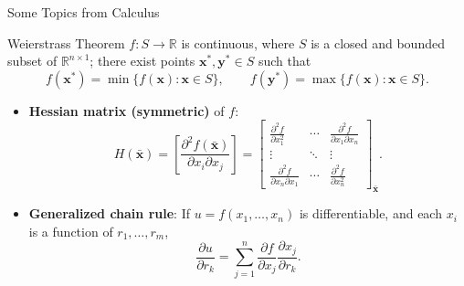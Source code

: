 \documentclass[aspectratio=169,hyperref,UTF8,CJK]{beamer}
\newcommand{\R}{\mathbb{R}}
\newcommand{\vect}[1]{\boldsymbol{#1}}
\begin{document}
\begin{frame}{Some Topics from Calculus}
  \scriptsize
  \begin{block}{Weierstrass Theorem}
    $f:S\to\R$ is continuous, where $S$ is a closed and bounded subset of $\R^{n\times1}$; there exist points $\vect{x}^{*},\vect{y}^{*}\in S$ such that
    \begin{equation*}
      f(\vect{x}^{*})=\min\{f(\vect{x}):\vect{x}\in S\},\qquad
      f(\vect{y}^{*})=\max\{f(\vect{x}):\vect{x}\in S\}.
    \end{equation*}
  \end{block}
  \begin{itemize}
    \item \textbf{Hessian matrix (symmetric)} of $f$:
      \begin{equation*}
        H(\bar{\vect{x}})=\left[\frac{\partial^2 f(\bar{\vect{x}})}{\partial x_i\partial x_j}\right]
        =\begin{bmatrix}
        \frac{\partial^2 f}{\partial x_1^2}&\cdots&\frac{\partial^2 f}{\partial x_1\partial x_n}\\
        \vdots&\ddots&\vdots\\
        \frac{\partial^2 f}{\partial x_n\partial x_1}&\cdots&\frac{\partial^2 f}{\partial x_n^2}
        \end{bmatrix}_{\bar{\vect{x}}}.
      \end{equation*}
    \item \textbf{Generalized chain rule}: If $u=f(x_1,\ldots,x_n)$ is differentiable, and each $x_i$ is a function of $r_1,\ldots,r_m$,
      \begin{equation*}
        \frac{\partial u}{\partial r_k}=\sum_{j=1}^{n}\frac{\partial f}{\partial x_j}\frac{\partial x_j}{\partial r_k}.
      \end{equation*}
  \end{itemize}
\end{frame}
\end{document}
